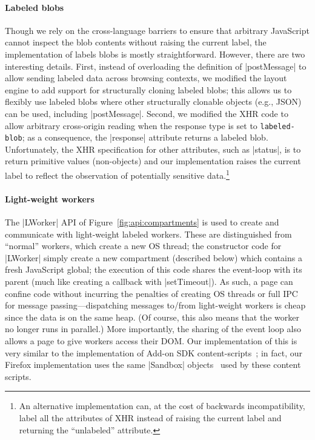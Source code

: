 \paragraph{Labeled blobs}
%
Though we rely on the cross-language barriers to ensure that arbitrary
JavaScript cannot inspect the blob contents without raising the
current label, the implementation of labels blobs is mostly straightforward.
%
However, there are two interesting details.
%
First, instead of overloading the definition of \js|postMessage| to
allow sending labeled data across browsing contexts, we modified the
layout engine to add support for structurally cloning labeled blobs;
this allows us to flexibly use labeled blobs where other structurally
clonable objects (e.g., JSON) can be used, including \js|postMessage|.
%
Second, we modified the XHR code to allow arbitrary cross-origin reading
when the response type is set to \verb|labeled-blob|;
%
as a consequence, the \js|response| attribute returns a labeled blob.
%
Unfortunately, the XHR specification for other attributes, such as
\js|status|, is to return primitive values (non-objects) and our
implementation raises the current label to reflect the observation of
potentially sensitive data.\footnote{
An alternative implementation can, at the cost of backwards
incompatibility, label all the attributes of XHR instead of raising
the current label and returning the ``unlabeled'' attribute.
}

\paragraph{Light-weight workers}
%
The \js|LWorker| API of Figure~\ref{fig:api:compartments} is used to
create and communicate with light-weight labeled workers.
%
These are distinguished from ``normal'' workers, which create a new OS thread; the
constructor code for \js|LWorker| simply create a new compartment
(described below) which contains a fresh JavaScript global; the
execution of this code shares the event-loop with its parent (much
like creating a callback with \js|setTimeout|).
%
As such, a page can confine code without incurring the
penalties of creating OS threads or full IPC for message
passing---dispatching messages to/from light-weight workers is cheap
since the data is on the same heap.
%
(Of course, this also means that the worker no longer runs in parallel.)
%
More importantly, the sharing of the event loop also allows a page to
give workers access their DOM\@.
%
Our implementation of this is very similar to the implementation of
Add-on SDK content-scripts~\cite{addon-sdk}; in fact, our Firefox
implementation uses the same \js|Sandbox| objects~\cite{mdn-sandbox}
used by these content scripts.
 

